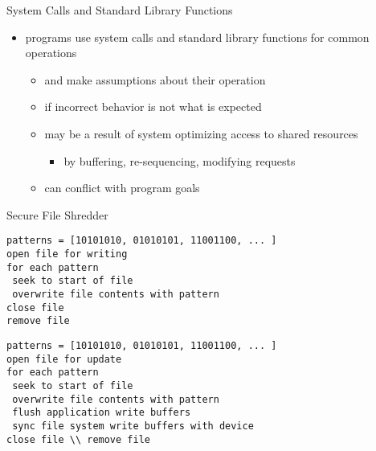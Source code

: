 \documentclass{beamer}
\begin{document}
\begin{frame}{System Calls and Standard Library Functions}
  \begin{itemize}
  \item programs use system calls and standard library
    functions for common operations
    \begin{itemize}
    \item and make assumptions about their operation
    \item if incorrect behavior is not what is expected
    \item may be a result of system optimizing access to
      shared resources
      \begin{itemize}
      \item by buffering, re-sequencing, modifying requests
      \end{itemize}
    \item can conflict with program goals 
    \end{itemize}
  \end{itemize}
\end{frame}


\begin{frame}[fragile]{Secure File Shredder}
  \begin{verbatim}
patterns = [10101010, 01010101, 11001100, ... ]
open file for writing
for each pattern
 seek to start of file
 overwrite file contents with pattern
close file
remove file
  \end{verbatim}
\begin{verbatim}
patterns = [10101010, 01010101, 11001100, ... ]
open file for update
for each pattern
 seek to start of file
 overwrite file contents with pattern
 flush application write buffers
 sync file system write buffers with device
close file \\ remove file
\end{verbatim}
\end{frame}
\end{document}
